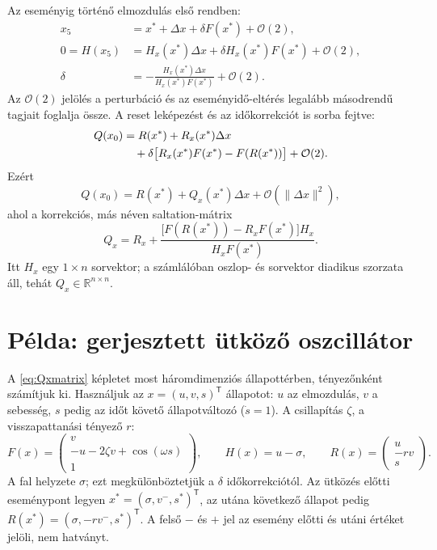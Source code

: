 Az eseményig történő elmozdulás első rendben:
\begin{align}
x_5&=x^*+\Delta x+\delta F(x^*)+\mathcal O(2),\\
0=H(x_5)&=H_x(x^*)\Delta x+\delta H_x(x^*)F(x^*)+\mathcal O(2),\\
\delta&=-\frac{H_x(x^*)\Delta x}{H_x(x^*)F(x^*)}+\mathcal O(2).
\end{align}
Az $\mathcal O(2)$ jelölés a perturbáció és az eseményidő-eltérés legalább másodrendű tagjait foglalja össze. A reset leképezést és az időkorrekciót is sorba fejtve:
\begin{align}
Q(x_0)&=R(x^*)+R_x(x^*)\Delta x\notag\\
&\quad+\delta\bigl[R_x(x^*)F(x^*)-F(R(x^*))\bigr]+\mathcal O(2).
\label{linearizaltx4}
\end{align}
Ezért
\begin{equation}\label{linearizaltlekepezes}
Q(x_0)=R(x^*)+Q_x(x^*)\Delta x+\mathcal O(\|\Delta x\|^2),
\end{equation}
ahol a korrekciós, más néven saltation-mátrix
\begin{equation}\label{eq:Qxmatrix}
Q_x=R_x+\frac{\bigl[F(R(x^*))-R_xF(x^*)\bigr]H_x}{H_xF(x^*)}.
\end{equation}
Itt $H_x$ egy $1\times n$ sorvektor; a számlálóban oszlop- és sorvektor diadikus szorzata áll, tehát $Q_x\in\mathbb R^{n\times n}$.

\section{Példa: gerjesztett ütköző oszcillátor}
\examplebody

A \eqref{eq:Qxmatrix} képletet most háromdimenziós állapottérben, tényezőnként számítjuk ki. Használjuk az $x=(u,v,s)^{\mathsf T}$ állapotot: $u$ az elmozdulás, $v$ a sebesség, $s$ pedig az időt követő állapotváltozó ($\dot s=1$). A csillapítás $\zeta$, a visszapattanási tényező $r$:
\[
F(x)=\begin{pmatrix}v\\-u-2\zeta v+\cos(\omega s)\\1\end{pmatrix},\qquad
H(x)=u-\sigma,\qquad R(x)=\begin{pmatrix}u\\-rv\\s\end{pmatrix}.
\]
A fal helyzete $\sigma$; ezt megkülönböztetjük a $\delta$ időkorrekciótól. Az ütközés előtti eseménypont legyen $x^*=(\sigma,v^-,s^*)^{\mathsf T}$, az utána következő állapot pedig $R(x^*)=(\sigma,-rv^-,s^*)^{\mathsf T}$. A felső $-$ és $+$ jel az esemény előtti és utáni értéket jelöli, nem hatványt.


